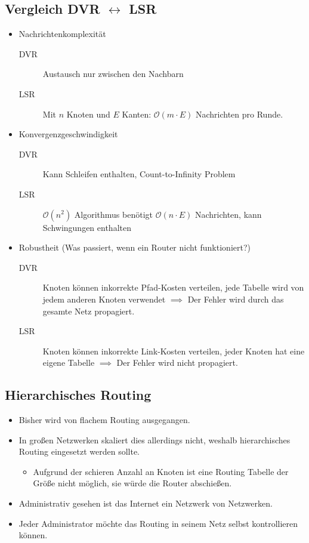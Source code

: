         \subsection{Vergleich DVR \(\leftrightarrow\) LSR}
            \begin{itemize}
            	\item Nachrichtenkomplexität
	            	\begin{description}
	            		\item[DVR] Austausch nur zwischen den Nachbarn
	            		\item[LSR] Mit \(n\) Knoten und \(E\) Kanten: \(\mathcal{O}(m \cdot E)\) Nachrichten pro Runde.
	            	\end{description}
            	\item Konvergenzgeschwindigkeit
	            	\begin{description}
	            		\item[DVR] Kann Schleifen enthalten, Count-to-Infinity Problem
	            		\item[LSR] \(\mathcal{O}(n^2)\) Algorithmus benötigt \(\mathcal{O}(n \cdot E)\) Nachrichten, kann Schwingungen enthalten
	            	\end{description}
            	\item Robustheit (Was passiert, wenn ein Router nicht funktioniert?)
	            	\begin{description}
	            		\item[DVR] Knoten können inkorrekte Pfad-Kosten verteilen, jede Tabelle wird von jedem anderen Knoten verwendet \(\implies\) Der Fehler wird durch das gesamte Netz propagiert.
	            		\item[LSR] Knoten können inkorrekte Link-Kosten verteilen, jeder Knoten hat eine eigene Tabelle \(\implies\) Der Fehler wird nicht propagiert.
	            	\end{description}
            \end{itemize}

        \subsection{Hierarchisches Routing}
            \begin{itemize}
            	\item Bisher wird von flachem Routing ausgegangen.
            	\item In großen Netzwerken skaliert dies allerdings nicht, weshalb hierarchisches Routing eingesetzt werden sollte.
                	\begin{itemize}
                		\item Aufgrund der schieren Anzahl an Knoten ist eine Routing Tabelle der Größe nicht möglich, sie würde die Router abschießen.
                	\end{itemize}
                \item Administrativ gesehen ist das Internet ein Netzwerk von Netzwerken.
                \item Jeder Administrator möchte das Routing in seinem Netz selbst kontrollieren können.
            \end{itemize}

